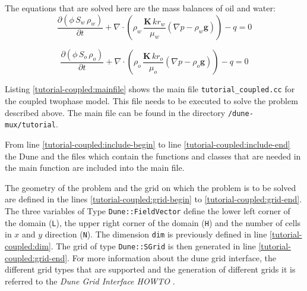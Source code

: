 The equations that are solved here are the mass balances of oil and water: \begin{equation}\label{massbalancewater}
\frac {\partial (\phi \, S_{w}\, \rho_{w})}{\partial t} + \nabla \cdot ( \rho_{w} \, \frac{\mathbf{K} \, kr_w}{\mu_{w}} (\nabla p - \rho_{w}\textbf{g})) - q = 0
\end{equation}

\begin{equation}\label{massbalanceoil}
\frac {\partial (\phi \, S_{o}\, \rho_{o})}{\partial t} + \nabla \cdot ( \rho_{o} \, \frac{\mathbf{K} \, kr_o}{\mu_{o}} (\nabla p - \rho_{o}\textbf{g})) - q = 0                                                                      \end{equation}


Listing \ref{tutorial-coupled:mainfile} shows the main file \texttt{tutorial\_coupled.cc} for the coupled twophase model. This file needs to be executed to solve the problem described above. The main file can be found in the directory \texttt{/dune-mux/tutorial}.

\begin{lst}\label{tutorial-coupled:mainfile} \mbox{}

\end{lst}

From line \ref{tutorial-coupled:include-begin} to line \ref{tutorial-coupled:include-end} the Dune and the \Dumux files which contain the functions and classes that are needed in the main function are included into the main file.

The geometry of the problem and the grid on which the problem is to be solved are defined in the lines \ref{tutorial-coupled:grid-begin} to \ref{tutorial-coupled:grid-end}. The three variables of Type \texttt{Dune::FieldVector} define the lower left corner of the domain (\texttt{L}), the upper right corner of the domain (\texttt{H}) and the number of cells in $x$ and $y$ direction (\texttt{N}). The dimension \texttt{dim} is previously defined in line \ref{tutorial-coupled:dim}. The grid of type \texttt{Dune::SGrid} is then generated in line \ref{tutorial-coupled:grid-end}. For more information about the dune grid interface, the different grid types that are supported and the generation of different grids it is referred to the \textit{Dune Grid Interface HOWTO} \cite{DUNE-HP}.

